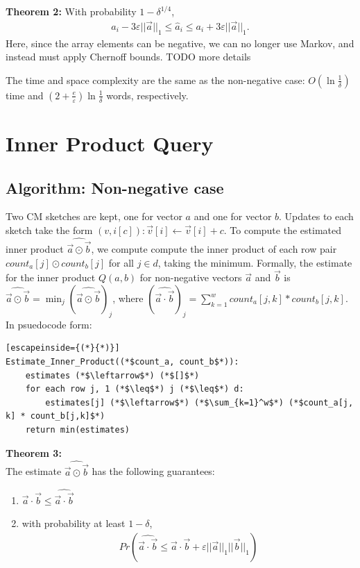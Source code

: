 \documentclass[11pt]{article}
\begin{document}
\textbf{Theorem 2:} With probability $1 - \delta^{1/4}$,
\begin{align}
    a_i - 3\varepsilon||\vec{a}||_1 \leq \hat{a}_i \leq a_i + 3\varepsilon||\vec{a}||_1. 
\end{align}
Here, since the array elements can be negative, we can no longer use Markov, and instead must apply Chernoff
bounds. TODO more details

The time and space complexity are the same as the non-negative case: $O(\ln
\frac{1}{\delta})$ time and $(2 + \frac{e}{\varepsilon})\ln \frac{1}{\delta}$
words, respectively. 

\section{Inner Product Query}
	\subsection{Algorithm: Non-negative case}
        Two CM sketches are kept, one for vector $a$ and one for vector $b$. Updates to each sketch take the form $(v, i[c]): \vec v[i] \leftarrow \vec v[i] + c$. To compute the estimated inner product $\widehat{\vec{a} \odot \vec{b}}$, we compute compute the inner product of each row pair $count_a[j] \odot count_b[j]$ for all $j \in d$, taking the minimum. Formally, the estimate for the inner product $\mathit{Q}(a,b)$ for non-negative vectors $\vec{a}$ and $\vec{b}$ is $\widehat{\vec{a} \odot \vec{b}} = \min_j(\widehat{\vec a \odot \vec b})_j$, where $(\widehat{\vec a \cdot \vec b})_j = \sum_{k=1}^w count_a[j,k] * count_b[j,k]$. In psuedocode form:\\
\begin{lstlisting}[escapeinside={(*}{*)}]
Estimate_Inner_Product((*$count_a, count_b$*)): 
    estimates (*$\leftarrow$*) (*$[]$*)
    for each row j, 1 (*$\leq$*) j (*$\leq$*) d:
        estimates[j] (*$\leftarrow$*) (*$\sum_{k=1}^w$*) (*$count_a[j, k] * count_b[j,k]$*)
    return min(estimates) 
\end{lstlisting}
\textbf{Theorem 3:}\\
        The estimate $\widehat{\vec{a} \odot \vec{b}}$ has the following guarantees:
        \begin{enumerate}[label=\textnormal{(\arabic*)}]
            \item $\vec a \cdot \vec b \leq \widehat{\vec a \cdot \vec b}$
            \item with probability at least $1 - \delta$, 
            \begin{align}
		        Pr(\widehat{\vec a \cdot \vec b} \leq \vec a \cdot \vec b + \varepsilon||\vec a||_1||\vec b||_1)
            \end{align}
        \end{enumerate}
\end{document}
